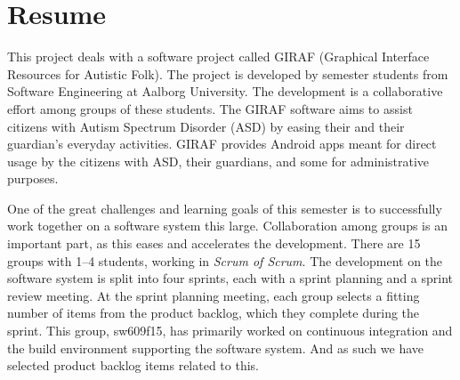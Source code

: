 \chapter*{Resume}
This project deals with a software project called GIRAF (Graphical Interface Resources for Autistic Folk). The project is developed by  semester students from Software Engineering at Aalborg University. The development is a collaborative effort among groups of these students. The GIRAF software aims to assist citizens with Autism Spectrum Disorder (ASD) by easing their and their guardian's everyday activities. GIRAF provides Android apps meant for direct usage by the citizens with ASD, their guardians, and some for administrative purposes.

One of the great challenges and learning goals of this semester is to successfully work together on a software system this large. Collaboration among groups is an important part, as this eases and accelerates the development. There are 15 groups with 1--4 students, working in \emph{Scrum of Scrum}. The development on the software system is split into four sprints, each with a sprint planning and a sprint review meeting. At the sprint planning meeting, each group selects a fitting number of items from the product backlog, which they complete during the sprint. This group, sw609f15, has primarily worked on continuous integration and the build environment supporting the software system. And as such we have selected product backlog items related to this.



